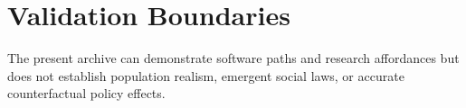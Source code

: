 \section{Validation Boundaries}
The present archive can demonstrate software paths and research affordances but does not establish
population realism, emergent social laws, or accurate counterfactual policy effects.
